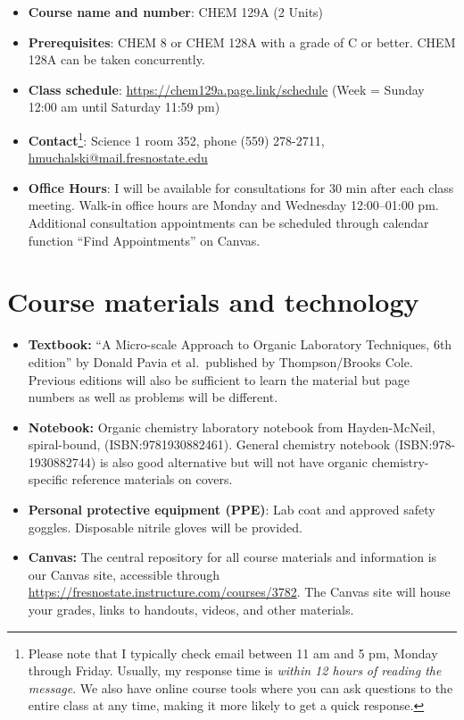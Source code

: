 \begin{itemize}
\tightlist
\item
  \textbf{Course name and number}: CHEM 129A (2 Units)
\item
  \textbf{Prerequisites}: CHEM 8 or CHEM 128A with a grade of C or
  better. CHEM 128A can be taken concurrently.
\item
  \textbf{Class schedule}: \url{https://chem129a.page.link/schedule}
  (Week = Sunday 12:00 am until Saturday 11:59 pm)
\item
  \textbf{Contact}\footnote{Please note that I typically check email
    between 11 am and 5 pm, Monday through Friday. Usually, my response
    time is \emph{within 12 hours of reading the message}. We also have
    online course tools where you can ask questions to the entire class
    at any time, making it more likely to get a quick response.}:
  Science 1 room 352, phone (559) 278-2711,
  \url{hmuchalski@mail.fresnostate.edu}
\item
  \textbf{Office Hours}: I will be available for consultations for 30
  min after each class meeting. Walk-in office hours are Monday and
  Wednesday 12:00--01:00 pm. Additional consultation appointments can be
  scheduled through calendar function ``Find Appointments'' on Canvas.
\end{itemize}

\hypertarget{course-materials-and-technology}{%
\section{Course materials and
technology}\label{course-materials-and-technology}}

\begin{itemize}
\tightlist
\item
  \textbf{Textbook:} ``A Micro-scale Approach to Organic Laboratory
  Techniques, 6th edition'' by Donald Pavia et al.~published by
  Thompson/Brooks Cole. Previous editions will also be sufficient to
  learn the material but page numbers as well as problems will be
  different.
\item
  \textbf{Notebook:} Organic chemistry laboratory notebook from
  Hayden-McNeil, spiral-bound, (ISBN:9781930882461). General chemistry
  notebook (ISBN:978-1930882744) is also good alternative but will not
  have organic chemistry-specific reference materials on covers.
\item
  \textbf{Personal protective equipment (PPE)}: Lab coat and approved
  safety goggles. Disposable nitrile gloves will be provided.
\item
  \textbf{Canvas:} The central repository for all course materials and
  information is our Canvas site, accessible through
  \url{https://fresnostate.instructure.com/courses/3782}. The Canvas
  site will house your grades, links to handouts, videos, and other
  materials.
\end{itemize}

